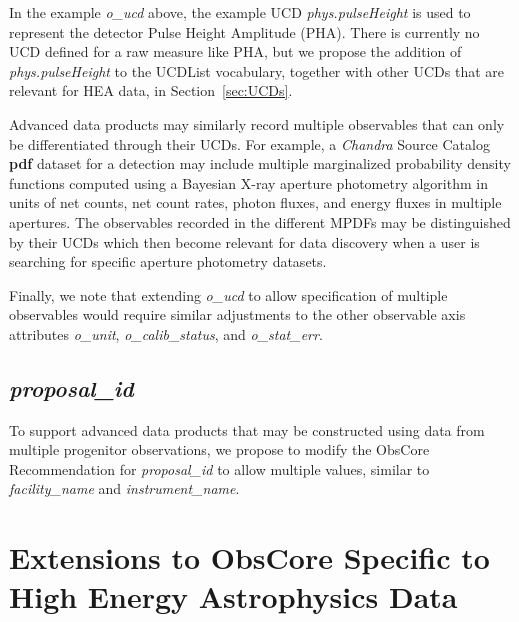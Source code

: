 \documentclass[11pt,a4paper]{ivoa}
\begin{document}
In the example {\em o\_ucd\/} above, the example UCD {\em phys.pulseHeight\/} is used to represent the detector Pulse Height Amplitude (PHA).  There is currently no UCD defined for a raw measure like PHA, but we propose the addition of {\em phys.pulseHeight\/} to the UCDList vocabulary, together with other UCDs that are relevant for HEA data, in Section~\ref{sec:UCDs}.

Advanced data products may similarly record multiple observables that can only be differentiated through their UCDs.  For example, a {\em Chandra\/} Source Catalog {\bf pdf} dataset for a detection may include multiple marginalized probability density functions computed using a Bayesian X-ray aperture photometry algorithm in units of net counts, net count rates, photon fluxes, and energy fluxes in multiple apertures.  The observables recorded in the different MPDFs may be distinguished by their UCDs which then become relevant for data discovery when a user is searching for specific aperture photometry datasets.

Finally, we note that extending {\em o\_ucd\/} to allow specification of multiple observables would require similar adjustments to the other observable axis attributes {\em o\_unit}, {\em o\_calib\_status}, and {\em o\_stat\_err}.



\subsection{{\em proposal\_id}}

To support advanced data products that may be constructed using data from multiple progenitor observations, we propose to modify the ObsCore Recommendation for {\em proposal\_id\/} to allow multiple values, similar to {\em facility\_name\/} and {\em instrument\_name}.


\section{Extensions to ObsCore Specific to High Energy Astrophysics Data}
\end{document}
